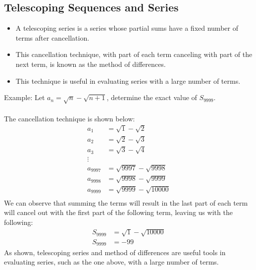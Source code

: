 \documentclass[12pt]{article}
\begin{document}
\subsection{Telescoping Sequences and Series}
\begin{itemize}
    \item A telescoping series is a series whose partial sums have a fixed number of terms after cancellation. 
    \item This cancellation technique, with part of each term canceling with part of the next term, is known as the method of differences.
    \item This technique is useful in evaluating series with a large number of terms.
\end{itemize}
Example: Let $a_n = \sqrt{n} - \sqrt{n + 1}$, determine the exact value of $S_{9999}$. \\ \\
The cancellation technique is shown below:
\begin{align*}
    a_1 & = \sqrt{1} - \sqrt{2} \\
    a_2 & = \sqrt{2} - \sqrt{3} \\
    a_3 & = \sqrt{3} - \sqrt{4} \\
    \vdots \\ 
    a_{9997} & = \sqrt{9997} - \sqrt{9998} \\
    a_{9998} & = \sqrt{9998} - \sqrt{9999} \\
    a_{9999} & = \sqrt{9999} - \sqrt{10000} \\
\end{align*}
We can observe that summing the terms will result in the last part of each term will cancel out with the first part of the following term, leaving us with the following:
\begin{align*}
    S_{9999} & = \sqrt{1}-\sqrt{10000} \\
    S_{9999} & = -99
\end{align*}
As shown, telescoping series and method of differences are useful tools in evaluating series, such as the one above, with a large number of terms. \\ \\ 
\end{document}
